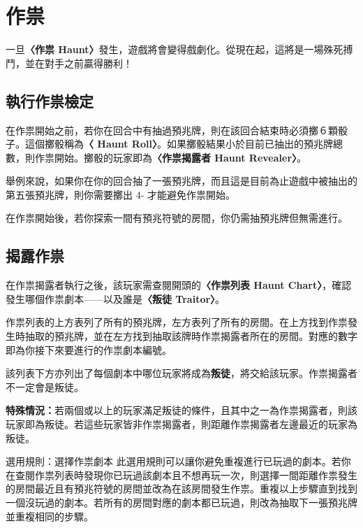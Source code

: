 
\section{作祟} \label{sec:haunt}

一旦\textbf{〈作祟 Haunt〉}發生，遊戲將會變得戲劇化。從現在起，這將是一場殊死搏鬥，並在對手之前贏得勝利！


\subsection{執行作祟檢定} \label{ssec:making-a-haunt-roll}

在作祟開始之前，若你在回合中有抽過預兆牌，則在該回合結束時必須擲６顆骰子。這個擲骰稱為\textbf{〈 Haunt Roll〉}。如果擲骰結果小於目前已抽出的預兆牌總數，則作祟開始。擲骰的玩家即為\textbf{〈作祟揭露者 Haunt Revealer〉}。

舉例來說，如果你在你的回合抽了一張預兆牌，而且這是目前為止遊戲中被抽出的第五張預兆牌，則你需要擲出 4- 才能避免作祟開始。

在作祟開始後，若你探索一間有預兆符號的房間，你仍需抽預兆牌但無需進行。


\subsection{揭露作祟} \label{ssec:revealing-the-roll}

在作祟揭露者執行之後，該玩家需查閱開頭的\textbf{〈作祟列表 Haunt Chart〉}，確認發生哪個作祟劇本——以及誰是\textbf{〈叛徒 Traitor〉}。

作祟列表的上方表列了所有的預兆牌，左方表列了所有的房間。在上方找到作祟發生時抽取的預兆牌，並在左方找到抽取該牌時作祟揭露者所在的房間。對應的數字即為你接下來要進行的作祟劇本編號。

該列表下方亦列出了每個劇本中哪位玩家將成為\textbf{叛徒}，將交給該玩家。作祟揭露者不一定會是叛徒。

\textbf{特殊情況：}若兩個或以上的玩家滿足叛徒的條件，且其中之一為作祟揭露者，則該玩家即為叛徒。若這些玩家皆非作祟揭露者，則距離作祟揭露者左邊最近的玩家為叛徒。

\begin{RuleBox}{選用規則：選擇作祟劇本}
	此選用規則可以讓你避免重複進行已玩過的劇本。若你在查閱作祟列表時發現你已玩過該劇本且不想再玩一次，則選擇一間距離作祟發生的房間最近且有預兆符號\OmenSymbol{}的房間並改為在該房間發生作祟。重複以上步驟直到找到一個沒玩過的劇本。若所有的房間對應的劇本都已玩過，則改為抽取下一張預兆牌並重複相同的步驟。
\end{RuleBox}

